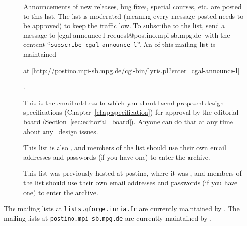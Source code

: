 \begin{description}
\item[]
     Announcements of new releases, bug fixes, special courses, etc. are posted
     to this list.  The list is moderated (meaning every message posted needs
     to be approved) to keep the traffic low.
     To subscribe to the list, send a message to
     {\nonlinkedpath|cgal-announce-l-request@postino.mpi-sb.mpg.de|}
     with the content ``\texttt{subscribe cgal-announce-l}''.
     An 
     of this mailing list is maintained%
     \begin{ccTexOnly}
     at \nonlinkedpath|http://postino.mpi-sb.mpg.de/cgi-bin/lyris.pl?enter=cgal-announce-l|
     \end{ccTexOnly}.

\item[]
     This is the email address to which you should
     send proposed design specifications (Chapter~\ref{chap:specification})
     for approval by the editorial
     board (Section~\ref{sec:editorial_board}). Anyone can do that
     at any time about any \cgal\ design issues.

     This list is also
     , and members of the list should use their own
     email addresses and passwords (if you have one) to enter the archive.

     This list was previously hosted at postino, where it was
     , and members of the list should use their own
     email addresses and passwords (if you have one) to enter the archive.
\end{description}

The mailing lists at \texttt{lists.gforge.inria.fr} are currently maintained by
.
The mailing lists at \texttt{postino.mpi-sb.mpg.de}
are currently
maintained by .
